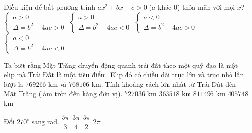 \begin{ex}%
Điều kiện để bất phương trình $a x^2 + b x + c >0$ ($a$ khác $0$) thỏa mãn với mọi $x$? 
	\choice
	{$\begin{cases}
a >0 \\ 
\Delta = b^2 - 4ac >0
\end{cases}$}
	{\True $\begin{cases}
a >0 \\ 
\Delta = b^2 - 4ac <0
\end{cases}$}
	{$\begin{cases}
a < 0 \\ 
\Delta = b^2 - 4ac >0
\end{cases}$}
	{$\begin{cases}
a < 0 \\ 
\Delta = b^2 - 4ac < 0
\end{cases}$}
\end{ex}

\begin{ex}%
Ta biết rằng Mặt Trăng chuyển động quanh trái đất theo một quỹ đạo là một elip mà Trái Đất là một tiêu điểm. Elip đó có chiều dài trục lớn và trục nhỏ lần lượt là $769 266$ km và $768 106$ km. Tính khoảng cách lớn nhất từ Trái Đất đến Mặt Trăng (làm tròn đến hàng đơn vị). 
	\choice
	{$727 036$ km}
	{$363 518$ km}
	{$811 496$ km}
	{\True $405 748$ km}
\end{ex}

\begin{ex}%
Đổi $270^{\circ}$ sang rad. 
	\choice
	{$\dfrac{5 \pi}{3}$}
	{$\dfrac{3 \pi}{4}$}
	{\True $\dfrac{3 \pi}{2}$}
	{$2 \pi$}
\end{ex}

